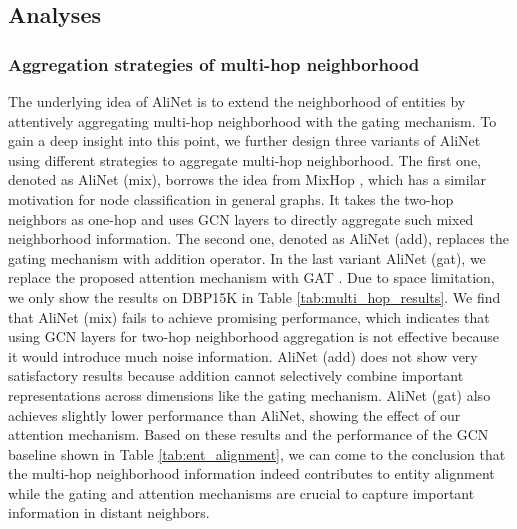 \documentclass[letterpaper]{article} \usepackage{aaai20}  \usepackage{times}  \usepackage{helvet} \usepackage{courier}  \usepackage[hyphens]{url}  \usepackage{graphicx} \urlstyle{rm} \def\UrlFont{\rm}  \frenchspacing  \setlength{\pdfpagewidth}{8.5in}  \setlength{\pdfpageheight}{11in}  \usepackage{amsmath}
\begin{document}
\subsection{Analyses}
\subsubsection{Aggregation strategies of multi-hop neighborhood}
The underlying idea of AliNet is to extend the neighborhood of entities by attentively aggregating multi-hop neighborhood with the gating mechanism. To gain a deep insight into this point, we further design three variants of AliNet using different strategies to aggregate multi-hop neighborhood. The first one, denoted as AliNet (mix), borrows the idea from MixHop \cite{MixHop}, which has a similar motivation for node classification in general graphs. It takes the two-hop neighbors as one-hop and uses GCN layers to directly aggregate such mixed neighborhood information. The second one, denoted as AliNet (add), replaces the gating mechanism with addition operator. In the last variant AliNet (gat), we replace the proposed attention mechanism with GAT \cite{GAT}. Due to space limitation, we only show the results on DBP15K in Table \ref{tab:multi_hop_results}. We find that AliNet (mix) fails to achieve promising performance, which indicates that using GCN layers for two-hop neighborhood aggregation is not effective because it would introduce much noise information. AliNet (add) does not show very satisfactory results because addition cannot selectively combine important representations across dimensions like the gating mechanism. AliNet (gat) also achieves slightly lower performance than AliNet, showing the effect of our attention mechanism. Based on these results and the performance of the GCN baseline shown in Table \ref{tab:ent_alignment}, we can come to the conclusion that the multi-hop neighborhood information indeed contributes to entity alignment while the gating and attention mechanisms are crucial to capture important information in distant neighbors.
\end{document}
